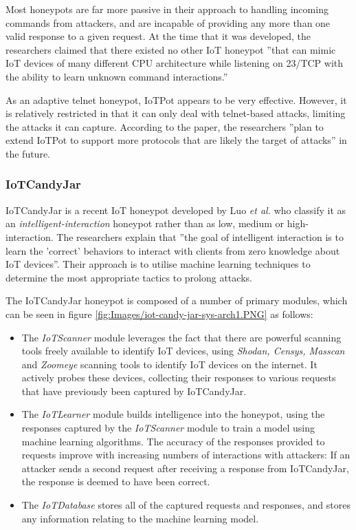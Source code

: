     Most honeypots are far more passive in their approach to handling incoming commands from attackers, and are incapable of providing any more than one valid response to a given request. At the time that it was developed, the researchers claimed that there existed no other IoT honeypot ''that can mimic IoT devices of many different CPU architecture while listening on 23/TCP with the ability to learn unknown command interactions.'' 
    
    As an adaptive telnet honeypot, IoTPot appears to be very effective. However, it is relatively restricted in that it can only deal with telnet-based attacks, limiting the attacks it can capture. According to the paper, the researchers ''plan to extend IoTPot to support more protocols that are likely the target of attacks'' in the future.

	
	\subsubsection{IoTCandyJar} \label{AboutIoTCandyJar}
IoTCandyJar is a recent IoT honeypot developed by Luo \textit{et al.} who classify it as an \textit{intelligent-interaction} honeypot rather than as low, medium or high-interaction. \cite{IoTCandyJar} The researchers explain that ''the goal of intelligent interaction is to learn the 'correct' behaviors to interact with clients from zero knowledge about IoT devices''. Their approach is to utilise machine learning techniques to determine the most appropriate tactics to prolong attacks.

The IoTCandyJar honeypot is composed of a number of primary modules, which can be seen in figure \ref{fig:Images/iot-candy-jar-sys-arch1.PNG} as follows:
\begin{itemize}
        \item The \textit{IoTScanner} module leverages the fact that there are powerful scanning tools freely available to identify IoT devices, using \textit{Shodan, Censys, Masscan} and \textit{Zoomeye} scanning tools to identify IoT devices on the internet. It actively probes these devices, collecting their responses to various requests that have previously been captured by IoTCandyJar. 

        \item The \textit{IoTLearner} module builds intelligence into the honeypot, using the responses captured by the \textit{IoTScanner} module to train a model using machine learning algorithms. The accuracy of the responses provided to requests improve with increasing numbers of interactions with attackers: If an attacker sends a second request after receiving a response from IoTCandyJar, the response is deemed to have been correct.

      \item The \textit{IoTDatabase} stores all of the captured requests and responses, and stores any information relating to the machine learning model.
\end{itemize}    

